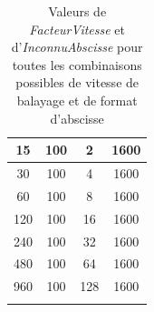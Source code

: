 \documentclass[a4paper, 12pt]{article}
\begin{document}
\begin{longtable}[c]{|c|c|c|c|}
15         & 100             & 2              & 1600    \\ \hline
30         & 100             & 4              & 1600    \\ \hline
60         & 100             & 8              & 1600    \\ \hline
120        & 100             & 16             & 1600    \\ \hline
240        & 100             & 32             & 1600    \\ \hline
480        & 100             & 64             & 1600    \\ \hline
960        & 100             & 128            & 1600    \\ \hline

\caption{Valeurs de \emph{FacteurVitesse} et d'\emph{InconnuAbscisse} pour toutes les combinaisons possibles de vitesse de balayage et de format d'abscisse}

\label{tab:ValeursFacteurVitesse}\\
\end{longtable}
\end{document}

